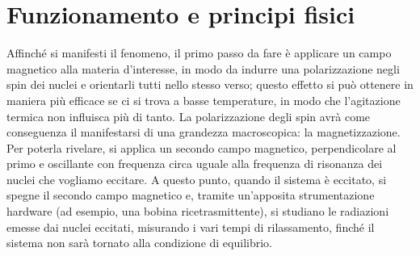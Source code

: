 \documentclass{report}
\numberwithin{equation}{section}
\numberwithin{figure}{section}
\begin{document}
\section{Funzionamento e principi fisici}
Affinché si manifesti il fenomeno, il primo passo da fare è applicare un campo magnetico alla materia d'interesse, in modo da indurre una polarizzazione negli spin dei nuclei e orientarli tutti nello stesso verso; questo effetto si può ottenere in maniera più efficace se ci si trova a basse temperature, in modo che l'agitazione termica non influisca più di tanto. La polarizzazione degli spin avrà come conseguenza il manifestarsi di una grandezza macroscopica: la magnetizzazione. Per poterla rivelare, si applica un secondo campo magnetico, perpendicolare al primo e oscillante con frequenza circa uguale alla frequenza di risonanza dei nuclei che vogliamo eccitare. A questo punto, quando il sistema è eccitato, si spegne il secondo campo magnetico e, tramite un'apposita strumentazione hardware (ad esempio, una bobina ricetrasmittente), si studiano le radiazioni emesse dai nuclei eccitati, misurando i vari tempi di rilassamento, finché il sistema non sarà tornato alla condizione di equilibrio.
\end{document}
